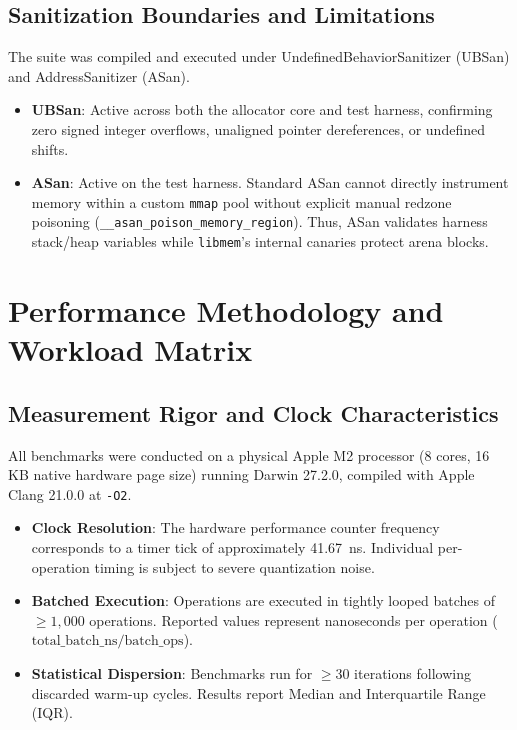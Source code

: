 \documentclass[11pt,a4paper]{article}
\begin{document}
\subsection{Sanitization Boundaries and Limitations}
The suite was compiled and executed under UndefinedBehaviorSanitizer (UBSan) and AddressSanitizer (ASan).
\begin{itemize}
    \item \textbf{UBSan}: Active across both the allocator core and test harness, confirming zero signed integer overflows, unaligned pointer dereferences, or undefined shifts.
    \item \textbf{ASan}: Active on the test harness. Standard ASan cannot directly instrument memory within a custom \texttt{mmap} pool without explicit manual redzone poisoning (\texttt{\_\_asan\_poison\_memory\_region}). Thus, ASan validates harness stack/heap variables while \texttt{libmem}'s internal canaries protect arena blocks.
\end{itemize}

\section{Performance Methodology and Workload Matrix}

\subsection{Measurement Rigor and Clock Characteristics}
All benchmarks were conducted on a physical Apple M2 processor (8 cores, 16 KB native hardware page size) running Darwin 27.2.0, compiled with Apple Clang 21.0.0 at \texttt{-O2}.
\begin{itemize}
    \item \textbf{Clock Resolution}: The hardware performance counter frequency corresponds to a timer tick of approximately 41.67~ns. Individual per-operation timing is subject to severe quantization noise.
    \item \textbf{Batched Execution}: Operations are executed in tightly looped batches of $\ge 1,000$ operations. Reported values represent nanoseconds per operation ($\text{total\_batch\_ns} / \text{batch\_ops}$).
    \item \textbf{Statistical Dispersion}: Benchmarks run for $\ge 30$ iterations following discarded warm-up cycles. Results report Median and Interquartile Range (IQR).
\end{itemize}
\end{document}
